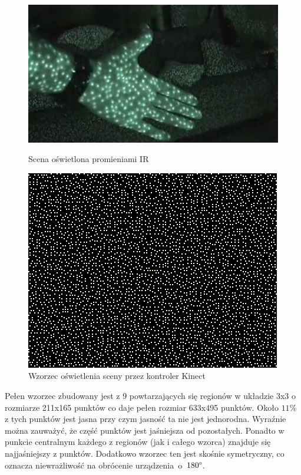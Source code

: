 	\begin{figure}
		\centering
		\begin{minipage}[b]{0.48\linewidth}
			\centering   
			\includegraphics[width=\textwidth]{images/kinectNightVision.jpg}	
			\caption{Scena oświetlona promieniami IR\cite{flatley2011}}
			\label{fig:characteristics:kinect:nightVision}
		\end{minipage}
		\begin{minipage}[b]{0.48\linewidth}
			\centering 
			\includegraphics[width=\textwidth]{images/kinect-pattern_3x3.png}
			\caption{Wzorzec oświetlenia sceny przez kontroler Kinect \cite{reichinger2011}}
			\label{fig:characteristics:kinect:dotPattern}
		\end{minipage}	
	\end{figure}
		
	Pełen wzorzec zbudowany jest z 9 powtarzających się regionów w układzie 3x3 o rozmiarze 211x165 punktów co daje pełen rozmiar 633x495 punktów. Około $11\%$ z tych punktów jest jasna przy czym jasność ta nie jest jednorodna. Wyraźnie można zauważyć, że część punktów jest jaśniejsza od pozostałych. Ponadto w punkcie centralnym każdego z regionów (jak i całego wzorca) znajduje się najjaśniejszy z punktów. Dodatkowo wzorzec ten jest skośnie symetryczny, co oznacza niewrażliwość na obrócenie urządzenia~o~$180\degree$.\\
		
